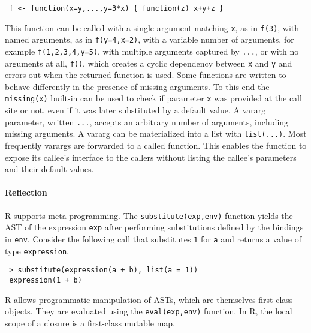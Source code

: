 \documentclass[review,screen,acmsmall]{acmart}
\renewcommand{\c}[1]{\lstinline |#1|\xspace}
\begin{document}
\begin{lstlisting}
 f <- function(x=y,...,y=3*x) { function(z) x+y+z }
\end{lstlisting}


This function can be called with a single argument matching \c x, as in
\c{f(3)}, with named arguments, as in \c{f(y=4,x=2)}, with a variable number of
arguments, for example \c{f(1,2,3,4,y=5)}, with multiple arguments captured by
\c{...}, or with no arguments at all, \c{f()}, which creates a cyclic dependency
between \c x and \c y and errors out when the returned function is used. Some
functions are written to behave differently in the presence of missing
arguments. To this end the \c{missing(x)} built-in can be used to check if
parameter \c{x} was provided at the call site or not, even if it was later
substituted by a default value. A vararg parameter, written \c{...}, accepts an
arbitrary number of arguments, including missing arguments. A vararg can be
materialized into a list with \c{list(...)}. Most frequently varargs are
forwarded to a called function. This enables the function to expose its callee's
interface to the callers without listing the callee's parameters and their
default values.

\paragraph{Reflection}
R supports meta-programming. The \c{substitute(exp,env)} function yields the AST
of the expression \c{exp} after performing substitutions defined by the bindings
in \c{env}. Consider the following call that substitutes \c 1 for \c a and
returns a value of type \c{expression}.

\begin{lstlisting}
 > substitute(expression(a + b), list(a = 1))
 expression(1 + b)
\end{lstlisting}

R allows programmatic manipulation of ASTs, which are themselves first-class
objects. They are evaluated using the \c{eval(exp,env)} function. In R, the
local scope of a closure is a first-class mutable map.
\end{document}
